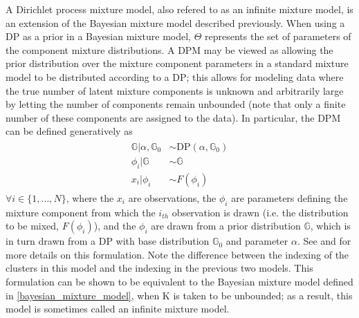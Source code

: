 \documentclass[twocolumn, final]{svjour3}
\begin{document}
A Dirichlet process mixture model, also refered to as an infinite mixture model, is an extension of the Bayesian mixture model described previously. 
When using a DP as a prior in a Bayesian mixture model, $\Theta$ represents the set of parameters of the component mixture distributions. A DPM may be viewed as allowing the prior distribution over the mixture component parameters in a standard mixture model to be distributed according to a DP; this allows for modeling data where the true number of latent mixture components is unknown and arbitrarily large by letting the number of components remain unbounded (note that only a finite number of these components are assigned to the data). In particular, the DPM can be defined generatively as
\begin{align}
\begin{split}
	\mathbb{G} | \alpha, \mathbb{G}_{0}  &\sim  \text{DP}(\alpha, \mathbb{G}_{0}) \\
	\phi_{i} | \mathbb{G}  &\sim  \mathbb{G} \\
	x_{i}|\phi_{i} &\sim F(\phi_{i})
\end{split}
\end{align}
$\forall i \in \{ 1, \ldots, N \}$, where the $x_{i}$ are observations, the $\phi_{i}$ are parameters defining the mixture component from which the $i_{th}$ observation is drawn (i.e. the distribution to be mixed, $F(\phi_{i})$), and the $\phi_{i}$ are drawn from a prior distribution $\mathbb{G}$, which is in turn drawn from a DP with base distribution $\mathbb{G}_{0}$ and parameter $\alpha$. See \cite{gasthaus_2008} and \cite{gasthaus_thesis} for more details on this formulation. Note the difference between the indexing of the clusters in this model and the indexing in the previous two models. This formulation can be shown to be equivalent to the Bayesian mixture model defined in \eqref{bayesian_mixture_model}, when K is taken to be unbounded; as a result, this model is sometimes called an infinite mixture model.
\end{document}

